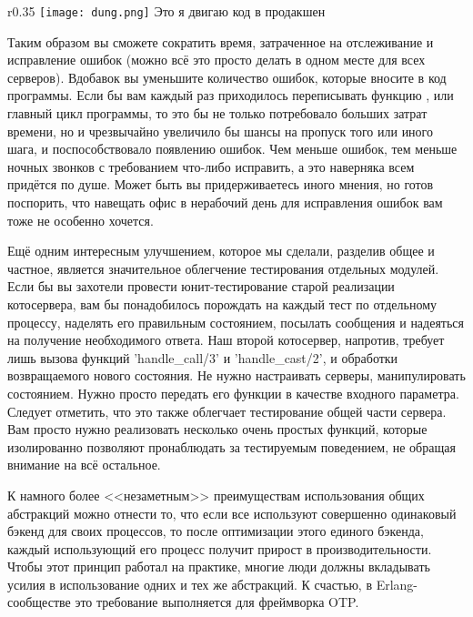 \begin{wrapfigure}{r}{0.35\linewidth}
    \texttt{[image: dung.png]}
    Это я двигаю код в продакшен
\end{wrapfigure}

Таким образом вы сможете сократить время, затраченное на отслеживание и исправление ошибок (можно всё это просто делать в одном месте для всех серверов).
Вдобавок вы уменьшите количество ошибок, которые вносите в код программы.
Если бы вам каждый раз приходилось переписывать функцию , или главный цикл программы, то это бы не только потребовало больших затрат времени, но и чрезвычайно увеличило бы шансы на пропуск того или иного шага, и поспособствовало появлению ошибок.
Чем меньше ошибок, тем меньше ночных звонков с требованием что\--либо исправить, а это наверняка всем придётся по душе.
Может быть вы придерживаетесь иного мнения, но готов поспорить, что навещать офис в нерабочий день для исправления ошибок вам тоже не особенно хочется.

Ещё одним интересным улучшением, которое мы сделали, разделив общее и частное, является значительное облегчение тестирования отдельных модулей.
Если бы вы захотели провести юнит\--тестирование старой реализации котосервера, вам бы понадобилось порождать на каждый тест по отдельному процессу, наделять его правильным состоянием, посылать сообщения и надеяться на получение необходимого ответа.
Наш второй котосервер, напротив, требует лишь вызова функций 'handle\_call/3' и 'handle\_cast/2', и обработки возвращаемого нового состояния.
Не нужно настраивать серверы, манипулировать состоянием.
Нужно просто передать его функции в качестве входного параметра.
Следует отметить, что это также облегчает тестирование общей части сервера.
Вам просто нужно реализовать несколько очень простых функций, которые изолированно позволяют пронаблюдать за тестируемым поведением, не обращая внимание на всё остальное.

К намного более <<незаметным>> преимуществам использования общих абстракций можно отнести то, что если все используют совершенно одинаковый бэкенд для своих процессов, то после оптимизации этого единого бэкенда, каждый использующий его процесс получит прирост в производительности.
Чтобы этот принцип работал на практике, многие люди должны вкладывать усилия в использование одних и тех же абстракций.
К счастью, в Erlang\--сообществе это требование выполняется для фреймворка OTP.

